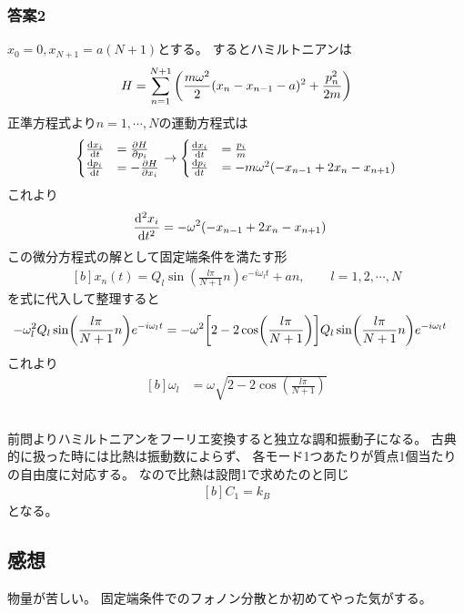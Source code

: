 \documentclass[../../sp_2015.tex]{subfiles}
\begin{document}
\subsubsection*{答案2}
\(x_0 = 0,x_{N+1}=a(N+1)\)とする。
するとハミルトニアンは
\begin{equation}\begin{aligned}[b]
    H = \sum_{n=1}^{N+1}\qty(\frac{m\omega^2}{2}(x_n-x_{n-1}-a)^2+\frac{p_n^2}{2m})
\end{aligned}\end{equation}
正準方程式より\(n=1,\cdots,N\)の運動方程式は
\begin{equation}\begin{aligned}[b]
    \begin{cases}
        \dv{x_i}{t}&= \pdv{H}{p_i}\\
        \dv{p_i}{t}&=-\pdv{H}{x_i}
    \end{cases}
    \rightarrow
    \begin{cases}
        \dv{x_i}{t} &= \frac{p_i}{m}\\
        \dv{p_i}{t} &= -m\omega^2(-x_{n-1}+2x_{n}-x_{n+1})
    \end{cases}
\end{aligned}\end{equation}
これより
\begin{equation}\begin{aligned}[b]
    \dv[2]{x_i}{t} &= -\omega^2(-x_{n-1}+2x_{n}-x_{n+1})
\end{aligned}\end{equation}
この微分方程式の解として固定端条件を満たす形
\begin{equation}\begin{aligned}[b]
    x_n(t) = Q_l\sin(\frac{l\pi}{N+1} n)e^{-i\omega_l t}+an,\qquad l=1,2,\cdots,N
\end{aligned}\end{equation}
を式に代入して整理すると
\begin{equation}\begin{aligned}[b]
    -\omega_l^2 Q_l\sin(\frac{l\pi}{N+1} n)e^{-i\omega_l t}
    &= -\omega^2\qty[2-2\cos(\frac{l\pi}{N+1})]Q_l\sin(\frac{l\pi}{N+1} n)e^{-i\omega_l t}
\end{aligned}\end{equation}
これより
\begin{equation}\begin{aligned}[b]
    \omega_l &= \omega \sqrt{2-2\cos(\frac{l\pi}{N+1})}
\end{aligned}\end{equation}

\subsection{}
前問よりハミルトニアンをフーリエ変換すると独立な調和振動子になる。
古典的に扱った時には比熱は振動数によらず、
各モード1つあたりが質点1個当たりの自由度に対応する。
なので比熱は設問1で求めたのと同じ
\begin{equation}\begin{aligned}[b]
    C_1 = k_B
\end{aligned}\end{equation}
となる。


\subsection*{感想}
物量が苦しい。
固定端条件でのフォノン分散とか初めてやった気がする。
\end{document}
